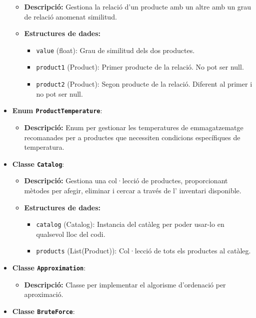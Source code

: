 \documentclass[a4paper,12pt]{report}
\begin{document}
\begin{itemize}
\begin{itemize}
		      \item \textbf{Descripció:} Gestiona la relació d'un producte amb un altre amb un grau de relació anomenat similitud.
		      \item \textbf{Estructures de dades:}
		            \begin{itemize}
			            \item \texttt{value} (float): Grau de similitud dels dos productes.
			            \item \texttt{product1} (Product): Primer producte de la relació. No pot ser null.
			            \item \texttt{product2} (Product): Segon producte de la relació. Diferent al primer i no pot ser null.
		            \end{itemize}
	      \end{itemize}
	\item \textbf{Enum \texttt{ProductTemperature}}:
	      \begin{itemize}
		      \item \textbf{Descripció:} Enum per gestionar les temperatures de emmagatzematge recomanades per a productes que necessiten condicions específiques de temperatura.
	      \end{itemize}
	\item \textbf{Classe \texttt{Catalog}}:
	      \begin{itemize}
		      \item \textbf{Descripció:} Gestiona una col·lecció de productes, proporcionant mètodes per afegir, eliminar i cercar a través de l' inventari disponible.
		      \item \textbf{Estructures de dades:}
		            \begin{itemize}
			            \item \texttt{catalog} (Catalog): Instancia del catàleg per poder usar-lo en qualsevol lloc del codi.
			            \item \texttt{products} (List(Product)): Col·lecció de tots els productes al catàleg.
		            \end{itemize}
	      \end{itemize} 
	\item \textbf{Classe \texttt{Approximation}}:
	      \begin{itemize}
		      \item \textbf{Descripció:} Classe per implementar el algorisme d'ordenació per aproximació.
	      \end{itemize}
	\item \textbf{Classe \texttt{BruteForce}}:

\end{itemize}
\end{document}
